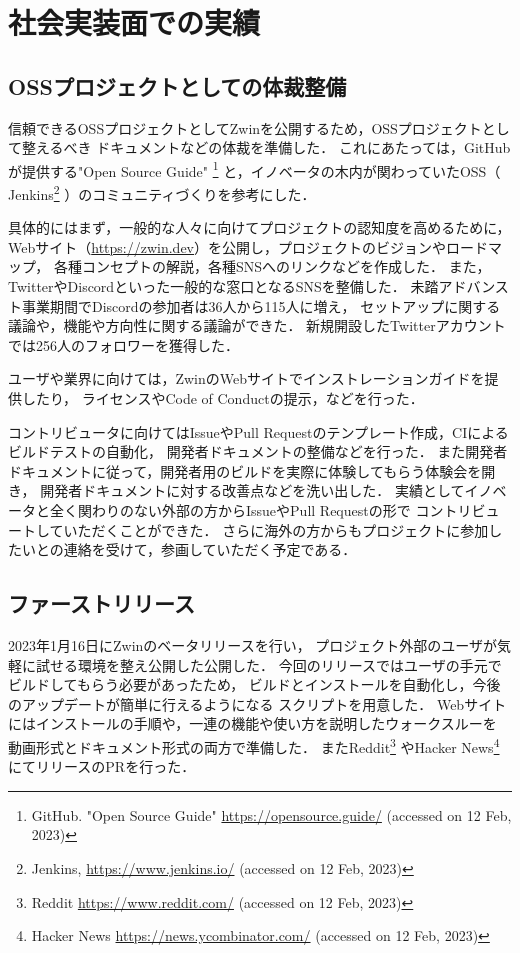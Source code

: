 \section{社会実装面での実績}

\subsection{OSSプロジェクトとしての体裁整備}

信頼できるOSSプロジェクトとしてZwinを公開するため，OSSプロジェクトとして整えるべき
ドキュメントなどの体裁を準備した．
これにあたっては，GitHubが提供する"Open Source Guide"
\footnote{GitHub. "Open Source Guide" \url{https://opensource.guide/} (accessed on 12 Feb, 2023)}
と，イノベータの木内が関わっていたOSS（
Jenkins\footnote{Jenkins, \url{https://www.jenkins.io/} (accessed on 12 Feb, 2023)}
）のコミュニティづくりを参考にした．

具体的にはまず，一般的な人々に向けてプロジェクトの認知度を高めるために，
Webサイト（\url{https://zwin.dev}）を公開し，プロジェクトのビジョンやロードマップ，
各種コンセプトの解説，各種SNSへのリンクなどを作成した．
また，TwitterやDiscordといった一般的な窓口となるSNSを整備した．
未踏アドバンスト事業期間でDiscordの参加者は36人から115人に増え，
セットアップに関する議論や，機能や方向性に関する議論ができた．
新規開設したTwitterアカウントでは256人のフォロワーを獲得した．

ユーザや業界に向けては，ZwinのWebサイトでインストレーションガイドを提供したり，
ライセンスやCode of Conductの提示，などを行った．

コントリビュータに向けてはIssueやPull Requestのテンプレート作成，CIによるビルドテストの自動化，
開発者ドキュメントの整備などを行った．
また開発者ドキュメントに従って，開発者用のビルドを実際に体験してもらう体験会を開き，
開発者ドキュメントに対する改善点などを洗い出した．
実績としてイノベータと全く関わりのない外部の方からIssueやPull Requestの形で
コントリビュートしていただくことができた．
さらに海外の方からもプロジェクトに参加したいとの連絡を受けて，参画していただく予定である．


\subsection{ファーストリリース}

2023年1月16日にZwinのベータリリースを行い，
プロジェクト外部のユーザが気軽に試せる環境を整え公開した公開した．
今回のリリースではユーザの手元でビルドしてもらう必要があったため，
ビルドとインストールを自動化し，今後のアップデートが簡単に行えるようになる
スクリプトを用意した．
Webサイトにはインストールの手順や，一連の機能や使い方を説明したウォークスルーを
動画形式とドキュメント形式の両方で準備した．
またReddit\footnote{Reddit \url{https://www.reddit.com/} (accessed on 12 Feb, 2023)}
やHacker News\footnote{Hacker News \url{https://news.ycombinator.com/} (accessed on 12 Feb, 2023)}
にてリリースのPRを行った．

